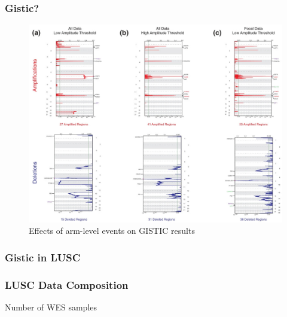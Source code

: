 \documentclass{beamer}
\begin{document}
    \begin{frame}
        \frametitle{Gistic?}

        \begin{figure}
            \includegraphics[width=0.6 \linewidth]{figures/Workflow/Gistic.jpg}
            \caption{Effects of arm-level events on GISTIC results \protect\cite{gistic-1}}
        \end{figure}
    \end{frame}

    \subsubsection{Gistic in LUSC}
    \begin{frame}
        \frametitle{LUSC Data Composition}

        \begin{table}
            \caption{Number of WES samples}
            \resizebox{!}{0.3 \textheight}
            {}
        \end{table}
    \end{frame}
\end{document}
